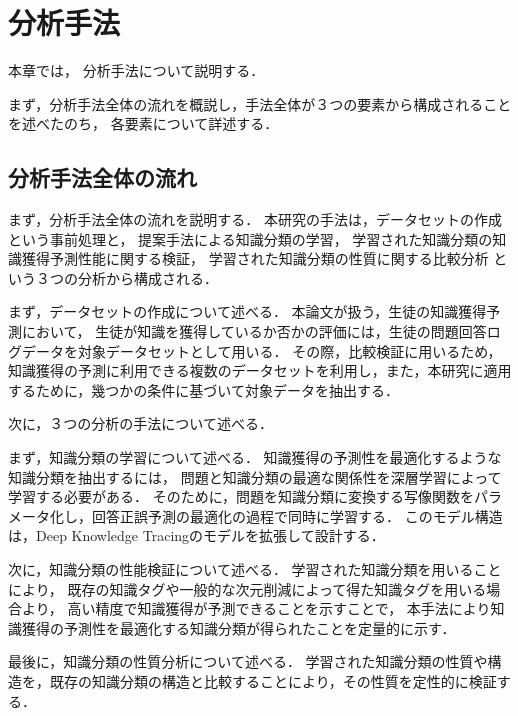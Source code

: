 \chapter{分析手法}
\label{chap:method}
\fancyhf{}
\rhead{\thepage}
\cfoot{\thepage}
本章では，
分析手法について説明する．

まず，分析手法全体の流れを概説し，手法全体が３つの要素から構成されることを述べたのち，
各要素について詳述する．

\vvspace


\section{分析手法全体の流れ}
まず，分析手法全体の流れを説明する．
本研究の手法は，データセットの作成という事前処理と，
提案手法による知識分類の学習，
学習された知識分類の知識獲得予測性能に関する検証，
学習された知識分類の性質に関する比較分析
という３つの分析から構成される．


まず，データセットの作成について述べる．
本論文が扱う，生徒の知識獲得予測において，
生徒が知識を獲得しているか否かの評価には，生徒の問題回答ログデータを対象データセットとして用いる．
その際，比較検証に用いるため，
知識獲得の予測に利用できる複数のデータセットを利用し，また，本研究に適用するために，幾つかの条件に基づいて対象データを抽出する．


次に，３つの分析の手法について述べる．

まず，知識分類の学習について述べる．
知識獲得の予測性を最適化するような知識分類を抽出するには，
問題と知識分類の最適な関係性を深層学習によって学習する必要がある．
そのために，問題を知識分類に変換する写像関数をパラメータ化し，回答正誤予測の最適化の過程で同時に学習する．
このモデル構造は，Deep Knowledge Tracingのモデルを拡張して設計する．

次に，知識分類の性能検証について述べる．
学習された知識分類を用いることにより，
既存の知識タグや一般的な次元削減によって得た知識タグを用いる場合より，
高い精度で知識獲得が予測できることを示すことで，
本手法により知識獲得の予測性を最適化する知識分類が得られたことを定量的に示す．

最後に，知識分類の性質分析について述べる．
学習された知識分類の性質や構造を，既存の知識分類の構造と比較することにより，その性質を定性的に検証する．


